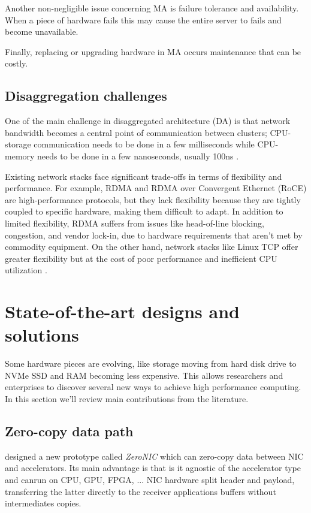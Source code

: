 \documentclass[11pt, a4paper]{article}
\begin{document}
Another non-negligible issue concerning MA is failure tolerance and availability. When a piece of hardware fails this may cause
the entire server to fails and become unavailable.

Finally, replacing or upgrading hardware in MA occurs maintenance that can be costly.

\subsection{Disaggregation challenges}

One of the main challenge in disaggregated architecture (DA) is that network bandwidth becomes a central point of communication between
clusters; CPU-storage communication needs to be done in a few milliseconds while CPU-memory needs to be done in a few nanoseconds, usually
100ns \cite{lin_disaggregated_2020}.

Existing network stacks face significant trade-offs in terms of flexibility and performance. For example, RDMA and RDMA
over Convergent Ethernet (RoCE) are high-performance protocols, but they lack flexibility because they are tightly coupled
to specific hardware, making them difficult to adapt. In addition to limited flexibility, RDMA suffers from issues like
head-of-line blocking, congestion, and vendor lock-in, due to hardware requirements that aren't met by commodity equipment.
On the other hand, network stacks like Linux TCP offer greater flexibility but at the cost of poor performance and
inefficient CPU utilization \cite{skiadopoulos_high-throughput_2024}.

\section{State-of-the-art designs and solutions} \label{sec:sota}

Some hardware pieces are evolving, like storage moving from hard disk drive to NVMe SSD and RAM becoming less expensive.
This allows researchers and enterprises to discover several new ways to achieve high performance computing. In this section
we'll review main contributions from the literature.

\subsection{Zero-copy data path}

 designed a new prototype called \textit{ZeroNIC} which can zero-copy data between
NIC and accelerators. Its main advantage is that is it agnostic of the accelerator type and canrun on CPU, GPU, FPGA, ...
NIC hardware split header and payload, transferring the latter directly to the receiver applications buffers without intermediates
copies.
\end{document}
